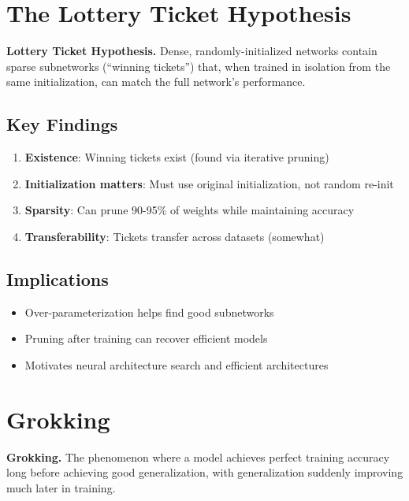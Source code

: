 \section{The Lottery Ticket Hypothesis}
\label{sec:lottery_ticket}

\textbf{Lottery Ticket Hypothesis.} Dense, randomly-initialized networks contain sparse subnetworks (``winning tickets'') that, when trained in isolation from the same initialization, can match the full network's performance.

\subsection{Key Findings}

\begin{enumerate}
    \item \textbf{Existence}: Winning tickets exist (found via iterative pruning)
    \item \textbf{Initialization matters}: Must use original initialization, not random re-init
    \item \textbf{Sparsity}: Can prune 90-95\% of weights while maintaining accuracy
    \item \textbf{Transferability}: Tickets transfer across datasets (somewhat)
\end{enumerate}

\subsection{Implications}

\begin{itemize}
    \item Over-parameterization helps find good subnetworks
    \item Pruning after training can recover efficient models
    \item Motivates neural architecture search and efficient architectures
\end{itemize}

\section{Grokking}
\label{sec:grokking}

\textbf{Grokking.} The phenomenon where a model achieves perfect training accuracy long before achieving good generalization, with generalization suddenly improving much later in training.

